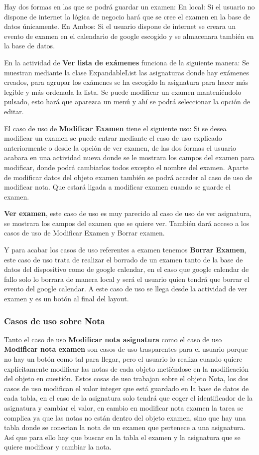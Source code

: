 Hay dos formas en las que se podrá guardar un examen:
En local: Si el usuario no dispone de internet la lógica de negocio hará que se cree el examen en la base de datos únicamente.
En Ambos: Si el usuario dispone de internet se creara un evento de examen en el calendario de google escogido  y se almacenara también en la base de datos.

En la actividad de \textbf{Ver lista de exámenes} funciona de la siguiente manera:
Se muestran mediante la clase ExpandableList las asignaturas donde hay exámenes creados, para agrupar los exámenes se ha escogido la asignatura para hacer más legible y más ordenada la lista.
Se puede modificar un examen manteniéndolo pulsado, esto hará que aparezca un menú y ahí se podrá seleccionar la opción de editar.

El caso de uso de \textbf{Modificar Examen} tiene el siguiente uso:
Si se desea modificar un examen se puede entrar mediante el caso de uso explicado anteriormente o desde la opción de ver examen, de las dos formas el usuario acabara en una actividad nueva donde se le mostrara los campos del examen para modificar, donde podrá cambiarlos todos excepto el nombre del examen.
Aparte de modificar datos del objeto examen también se podrá acceder al caso de uso de modificar nota. Que estará ligada a modificar examen cuando se guarde el examen.

\textbf{Ver examen}, este caso de uso es muy parecido al caso de uso de ver asignatura, se mostrara los campos del examen que se quiere ver.
También dará acceso a los casos de uso de Modificar Examen y Borrar examen.

Y para acabar los casos de uso referentes a examen tenemos \textbf{Borrar Examen}, este caso de uso trata de realizar el borrado de un examen tanto de la base de datos del dispositivo como de google calendar, en el caso que google calendar de fallo solo lo borrara de manera local y será el usuario quien tendrá que borrar el evento del google calendar.
A este caso de uso se llega desde la actividad de ver examen y es un botón al final del layout.

\subsubsection{Casos de uso sobre Nota}
\label{subsubsecc:Casos de uso sobre Nota}

Tanto el caso de uso \textbf{Modificar nota asignatura} como el caso de uso \textbf{Modificar nota examen} son casos de uso trasparentes para el usuario porque no hay un botón como tal para llegar, pero el usuario lo realiza cuando quiere explícitamente modificar las notas de cada objeto metiéndose en la modificación del objeto en cuestión.
Estos cosas de uso trabajan sobre el objeto Nota, los dos casos de uso modifican el valor integer que está guardado en la base de datos de cada tabla, en el caso de la asignatura solo tendrá que coger el identificador de la asignatura y cambiar el valor, en cambio en modificar nota examen la tarea se complica ya que las notas no están dentro del objeto examen, sino que hay una tabla donde se conectan la nota de un examen que pertenece a una asignatura. Así que para ello hay que buscar en la tabla el examen y la asignatura que se quiere modificar y cambiar la nota.

